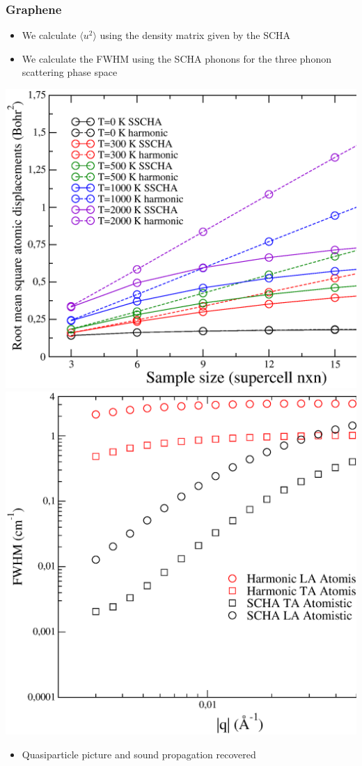 \documentclass{beamer}
\begin{document}
\begin{frame}

 \frametitle{Graphene}
 \begin{itemize}
  \item We calculate $\langle u^{2}\rangle$ using the density matrix given by the SCHA
  \item We calculate the FWHM using the SCHA phonons for the three phonon scattering phase space
 \end{itemize}
 \begin{center}
  \includegraphics[width=0.53\linewidth]{Pictures/Graphene/rms.eps}
  \includegraphics[width=0.45\linewidth]{Pictures/Graphene/lwatomistic.eps}
 \end{center}
 \begin{itemize}
  \item Quasiparticle picture and sound propagation recovered
 \end{itemize}

\end{frame}

\end{document}
